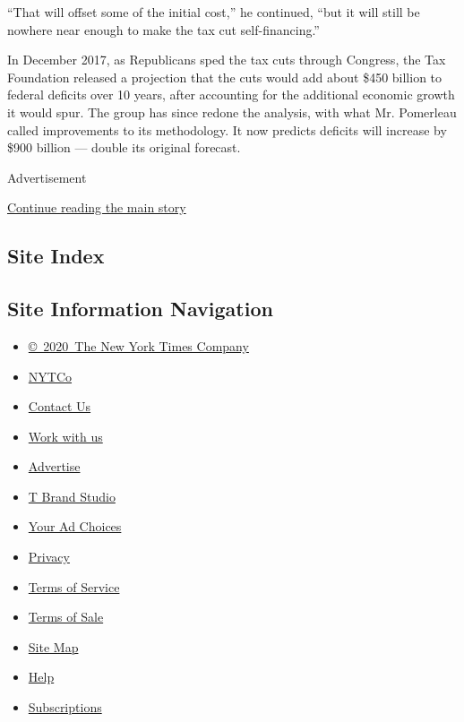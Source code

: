 ``That will offset some of the initial cost,'' he continued, ``but it
will still be nowhere near enough to make the tax cut self-financing.''

In December 2017, as Republicans sped the tax cuts through Congress, the
Tax Foundation released a projection that the cuts would add about \$450
billion to federal deficits over 10 years, after accounting for the
additional economic growth it would spur. The group has since redone the
analysis, with what Mr. Pomerleau called improvements to its
methodology. It now predicts deficits will increase by \$900 billion ---
double its original forecast.

Advertisement

\protect\hyperlink{after-bottom}{Continue reading the main story}

\hypertarget{site-index}{%
\subsection{Site Index}\label{site-index}}

\hypertarget{site-information-navigation}{%
\subsection{Site Information
Navigation}\label{site-information-navigation}}

\begin{itemize}
\tightlist
\item
  \href{https://help.nytimes3xbfgragh.onion/hc/en-us/articles/115014792127-Copyright-notice}{©~2020~The
  New York Times Company}
\end{itemize}

\begin{itemize}
\tightlist
\item
  \href{https://www.nytco.com/}{NYTCo}
\item
  \href{https://help.nytimes3xbfgragh.onion/hc/en-us/articles/115015385887-Contact-Us}{Contact
  Us}
\item
  \href{https://www.nytco.com/careers/}{Work with us}
\item
  \href{https://nytmediakit.com/}{Advertise}
\item
  \href{http://www.tbrandstudio.com/}{T Brand Studio}
\item
  \href{https://www.nytimes3xbfgragh.onion/privacy/cookie-policy\#how-do-i-manage-trackers}{Your
  Ad Choices}
\item
  \href{https://www.nytimes3xbfgragh.onion/privacy}{Privacy}
\item
  \href{https://help.nytimes3xbfgragh.onion/hc/en-us/articles/115014893428-Terms-of-service}{Terms
  of Service}
\item
  \href{https://help.nytimes3xbfgragh.onion/hc/en-us/articles/115014893968-Terms-of-sale}{Terms
  of Sale}
\item
  \href{https://spiderbites.nytimes3xbfgragh.onion}{Site Map}
\item
  \href{https://help.nytimes3xbfgragh.onion/hc/en-us}{Help}
\item
  \href{https://www.nytimes3xbfgragh.onion/subscription?campaignId=37WXW}{Subscriptions}
\end{itemize}
